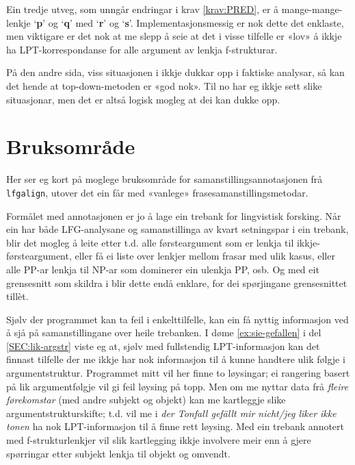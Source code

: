 \documentclass[12pt,a4paper,oneside,draft]{report}
\newcommand{\p}[1]{`\textbf{#1}'}
\begin{document}
Ein tredje utveg, som unngår endringar i krav \ref{krav:PRED}, er å
 mange\hyp{}mange\hyp{}lenkje \p{p} og \p{q} med \p{r} og
 \p{s}. Implementasjonsmessig er nok dette det enklaste, men viktigare
 er det nok at me slepp å seie at det i visse tilfelle er «lov» å
 ikkje ha LPT\hyp{}korrespondanse for alle argument av lenkja
 f\hyp{}strukturar.

På den andre sida, viss situasjonen i \Last ikkje dukkar opp i
 faktiske analysar, så kan det hende at top-down-metoden er «god
 nok». Til no har eg ikkje sett slike situasjonar, men det er altså
 logisk mogleg at dei kan dukke opp.

\section{Bruksområde}
\label{sec-5.5}


Her ser eg kort på moglege bruksområde for samanstillingsannotasjonen
 frå \texttt{lfgalign}, utover det ein får med «vanlege»
 frasesamanstillingsmetodar.

Formålet med annotasjonen er jo å lage ein trebank for lingvistisk
 forsking. Når ein har både LFG-analysane og samanstillinga av kvart
 setningspar i ein trebank, blir det mogleg å leite etter t.d. alle
 førsteargument som er lenkja til ikkje-førsteargument, eller få ei
 liste over lenkjer mellom frasar med ulik kasus, eller alle PP-ar
 lenkja til NP-ar som dominerer ein ulenkja PP, osb. Og med eit
 grensesnitt som skildra i \citet{dyvik2009lmp} blir dette endå
 enklare, for dei spørjingane grensesnittet tillèt.
 
Sjølv der programmet kan ta feil i enkelttilfelle, kan ein få nyttig
 informasjon ved å sjå på samanstillingane over heile trebanken.  I
 døme \ref{ex:sie-gefallen} i del \ref{SEC:lik-argstr} viste eg
 at, sjølv med fullstendig LPT\hyp{}informasjon kan det finnast tilfelle
 der me ikkje har nok informasjon til å kunne handtere ulik følgje i
 argumentstruktur. Programmet mitt vil her finne to løysingar; ei
 rangering basert på lik argumentfølgje vil gi feil løysing på topp.
 Men om me nyttar data frå \emph{fleire førekomstar} (med andre subjekt og
 objekt) kan me kartleggje slike argumentstrukturskifte; t.d. vil me i
 \emph{der Tonfall gefällt mir nicht/jeg liker ikke tonen} ha nok
 LPT\hyp{}informasjon til å finne rett løysing. Med ein trebank annotert
 med f\hyp{}strukturlenkjer vil slik kartlegging ikkje involvere meir enn å
 gjere spørringar etter subjekt lenkja til objekt og omvendt.
\end{document}
